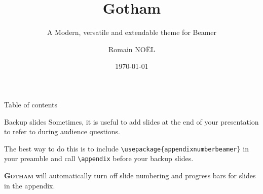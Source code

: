 \documentclass[aspectratio=169, 10pt]{beamer}
\title[]{Gotham}
\subtitle{A Modern, versatile and extendable theme for Beamer}
\date[]{\today}
\author[]{Romain NOËL}
\institute{Center for modern beamer themes}
\newcommand{\themename}{\textbf{\textsc{Gotham}}}
\begin{document}
\maketitle

	\begin{frame}[toc]{Table of contents}%
		\tableofcontents%
	\end{frame}

	







\appendix

	\begin{frame}[fragile]{Backup slides}
		Sometimes, it is useful to add slides at the end of your presentation to refer to during audience questions.

		The best way to do this is to include \verb|\usepackage{appendixnumberbeamer}| in your preamble and call \verb|\appendix| before your backup slides.

		\themename{} will automatically turn off slide numbering and progress bars for slides in the appendix.
	\end{frame}
\end{document}
